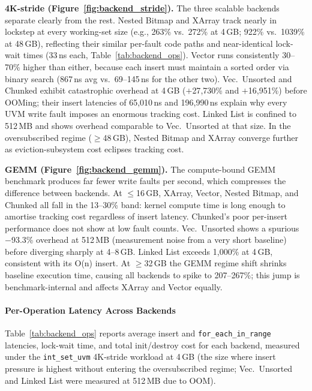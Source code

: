 \textbf{4K-stride (Figure~\ref{fig:backend_stride}).}\enspace
The three scalable backends separate clearly from the rest.
Nested Bitmap and XArray track nearly in lockstep at every working-set size
(e.g., 263\% vs.\ 272\% at 4\,GB; 922\% vs.\ 1039\% at 48\,GB), reflecting
their similar per-fault code paths and near-identical lock-wait times (33\,ns each,
Table~\ref{tab:backend_ops}).
Vector runs consistently 30--70\% higher than either, because each insert must
maintain a sorted order via binary search (867\,ns avg vs.\ 69--145\,ns for the
other two).
Vec.\ Unsorted and Chunked exhibit catastrophic overhead at 4\,GB
($+$27{,}730\% and $+$16{,}951\%) before OOMing; their insert latencies of 65{,}010\,ns
and 196{,}990\,ns explain why every UVM write fault imposes an enormous
tracking cost.
Linked List is confined to 512\,MB and shows overhead comparable to Vec.\ Unsorted at that size.
In the oversubscribed regime ($\geq$48\,GB), Nested Bitmap and XArray
converge further as eviction-subsystem cost eclipses tracking cost.

\textbf{GEMM (Figure~\ref{fig:backend_gemm}).}\enspace
The compute-bound GEMM benchmark produces far fewer write faults per second,
which compresses the difference between backends.
At $\leq$16\,GB, XArray, Vector, Nested Bitmap, and Chunked all fall in the
13--30\% band: kernel compute time is long enough to amortise tracking
cost regardless of insert latency.
Chunked's poor per-insert performance does not show at low fault counts.
Vec.\ Unsorted shows a spurious $-$93.3\% overhead at 512\,MB (measurement
noise from a very short baseline) before diverging sharply at 4--8\,GB.
Linked List exceeds 1{,}000\% at 4\,GB, consistent with its O(n) insert.
At $\geq$32\,GB the GEMM regime shift shrinks baseline execution time, causing
all backends to spike to 207--267\%; this jump is benchmark-internal and
affects XArray and Vector equally.

\paragraph{Per-Operation Latency Across Backends}
Table~\ref{tab:backend_ops} reports average insert and
\texttt{for\_each\_in\_range} latencies, lock-wait time, and total init/destroy
cost for each backend, measured under the \texttt{int\_set\_uvm} 4K-stride
workload at 4\,GB (the size where insert pressure is highest without entering
the oversubscribed regime; Vec.\ Unsorted and Linked List were measured at
512\,MB due to OOM).

